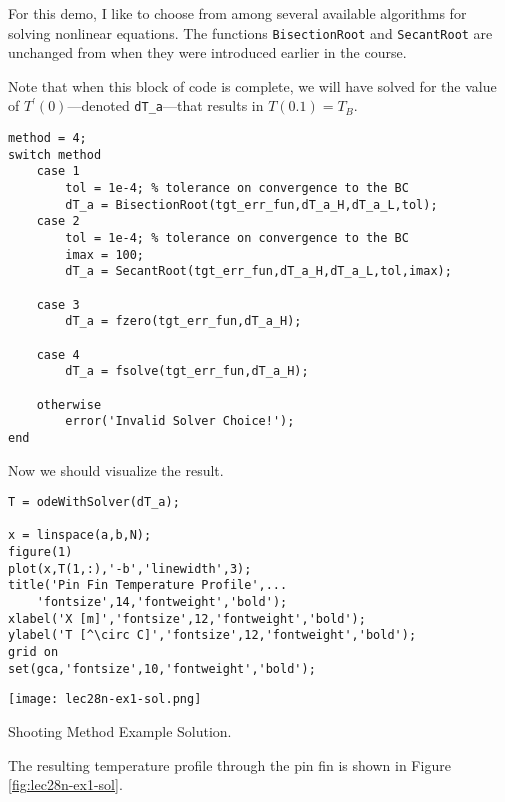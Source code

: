 For this demo, I like to choose from among several available algorithms for solving nonlinear equations.  The functions \lstinline[style=myMatlab]{BisectionRoot} and \lstinline[style=myMatlab]{SecantRoot} are unchanged from when they were introduced earlier in the course.

Note that when this block of code is complete, we will have solved for the value of $T^{\prime}(0)$---denoted \lstinline[style=myMatlab]{dT_a}---that results in $T(0.1)=T_B$.

\begin{lstlisting}[style=myMatlab,name=lec28n-ex1]
method = 4;
switch method
    case 1
        tol = 1e-4; % tolerance on convergence to the BC
        dT_a = BisectionRoot(tgt_err_fun,dT_a_H,dT_a_L,tol);
    case 2
        tol = 1e-4; % tolerance on convergence to the BC
        imax = 100;
        dT_a = SecantRoot(tgt_err_fun,dT_a_H,dT_a_L,tol,imax);
        
    case 3
        dT_a = fzero(tgt_err_fun,dT_a_H);
        
    case 4
        dT_a = fsolve(tgt_err_fun,dT_a_H);
        
    otherwise
        error('Invalid Solver Choice!');
end
\end{lstlisting}
Now we should visualize the result.  
\begin{lstlisting}[style=myMatlab,name=lec28n-ex1]
%% Solve one last time with converged dT_a
T = odeWithSolver(dT_a);

x = linspace(a,b,N);
figure(1)
plot(x,T(1,:),'-b','linewidth',3);
title('Pin Fin Temperature Profile',...
    'fontsize',14,'fontweight','bold');
xlabel('X [m]','fontsize',12,'fontweight','bold');
ylabel('T [^\circ C]','fontsize',12,'fontweight','bold');
grid on
set(gca,'fontsize',10,'fontweight','bold');
\end{lstlisting}
\begin{marginfigure}
\texttt{[image: lec28n-ex1-sol.png]}
\caption{Shooting Method Example Solution.}
\label{fig:lec28n-ex1-sol}
\end{marginfigure}

The resulting temperature profile through the pin fin is shown in Figure \ref{fig:lec28n-ex1-sol}.  


